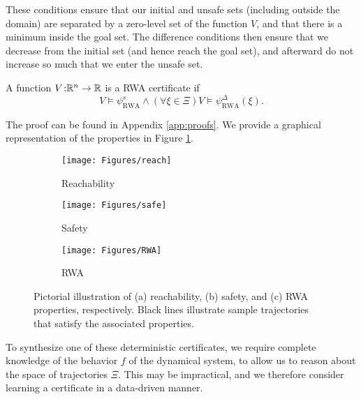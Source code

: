 These conditions ensure that our initial and unsafe sets (including outside the domain) are separated by a zero-level set of the function $V$, and that there is a minimum inside the goal set.
The difference conditions then ensure that we decrease from the initial set (and hence reach the goal set), and afterward do not increase so much that we enter the unsafe set.

\begin{prop}
\label{cert:RWA}
    A function $V \colon \\\mathbb{R}^n \rightarrow \mathbb{R}$ is a RWA certificate if
	 \begin{equation}
	     V \models \psi^s_\mathrm{RWA} \wedge (\forall \xi \in \Xi) V\models\psi^\Delta_\mathrm{RWA}(\xi).
	 \end{equation}
\end{prop}
The proof can be found in Appendix \ref{app:proofs}.
We provide a graphical representation of the properties in Figure \ref{fig:props}.

\begin{figure}[b]
    \centering
    \begin{subfigure}{0.3\linewidth}
        \texttt{[image: Figures/reach]}
        \caption{Reachability}
    \end{subfigure}\hfill
        \begin{subfigure}{0.3\linewidth}
        \texttt{[image: Figures/safe]}
        \caption{Safety}
    \end{subfigure}\hfill   
    \begin{subfigure}{0.3\linewidth}
        \texttt{[image: Figures/RWA]}
        \caption{RWA}
    \end{subfigure}
    \caption{Pictorial illustration of (a) reachability, (b) safety, and (c) RWA properties, respectively. Black lines illustrate sample trajectories that satisfy the associated properties.}
    \label{fig:props}
\end{figure}

To synthesize one of these deterministic certificates, we require complete knowledge of the behavior $f$ of the dynamical system, to allow us to reason about the space of trajectories $\Xi$.  
This may be impractical, and we therefore consider learning a certificate in a data-driven manner.
